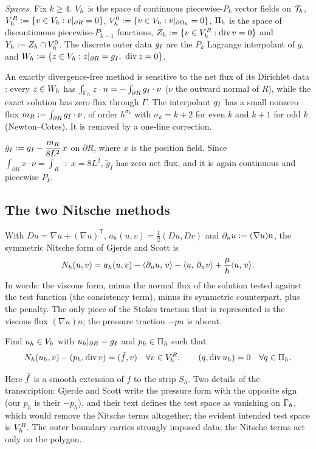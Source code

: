 \emph{Spaces.} Fix $k\ge4$. $V_h$ is the space of continuous piecewise-$P_k$ vector fields on $\mathcal T_h$, $V_h^R:=\{v\in V_h:v|_{\partial R}=0\}$, $V_h^0:=\{v\in V_h:v|_{\partial\Omega_h}=0\}$, $\Pi_h$ is the space of discontinuous piecewise-$P_{k-1}$ functions, $Z_h:=\{v\in V_h^R:\operatorname{div} v=0\}$ and $Y_h:=Z_h\cap V_h^0$. The discrete outer data $g_I$ are the $P_k$ Lagrange interpolant of $g$, and $W_h:=\{z\in V_h:z|_{\partial R}=g_I,\ \operatorname{div} z=0\}$.

An exactly divergence-free method is sensitive to the net flux of its Dirichlet data \cite{EickmannScottTscherpel2025}: every $z\in W_h$ has $\int_{\Gamma_h}z\cdot n=-\int_{\partial R}g_I\cdot\nu$ ($\nu$ the outward normal of $R$), while the exact solution has zero flux through $\Gamma$. The interpolant $g_I$ has a small nonzero flux $m_R:=\int_{\partial R}g_I\cdot\nu$, of order $h^{\sigma_k}$ with $\sigma_k=k+2$ for even $k$ and $k+1$ for odd $k$ (Newton--Cotes). It is removed by a one-line correction.

\begin{definition}\label{def:flux}
$\tilde g_I:=g_I-\dfrac{m_R}{8L^2}\,x$ on $\partial R$, where $x$ is the position field. Since $\int_{\partial R}x\cdot\nu=\int_R\div x=8L^2$, $\tilde g_I$ has zero net flux, and it is again continuous and piecewise $P_k$.
\end{definition}

\subsection{The two Nitsche methods}
With $Du=\nabla u+(\nabla u)^{\mathsf T}$, $a_h(u,v)=\frac12(Du,Dv)$ and $\partial_n u:=(\nabla u)n$, the symmetric Nitsche form of Gjerde and Scott is
\[
N_h(u,v)=a_h(u,v)-\langle \partial_n u,\, v\rangle-\langle u,\, \partial_n v\rangle+\frac{\mu}{h}\langle u,\, v\rangle.
\]
In words: the viscous form, minus the normal flux of the solution tested against the test function (the consistency term), minus its symmetric counterpart, plus the penalty. The only piece of the Stokes traction that is represented is the viscous flux $(\nabla u)n$; the pressure traction $-pn$ is absent.

\begin{definition}
Find $u_h\in V_h$ with $u_h|_{\partial R}=g_I$ and $p_h\in\Pi_h$ such that
\[
N_h(u_h,v)-(p_h,\operatorname{div} v)=(\tilde f,v)\quad\forall v\in V_h^R,\qquad (q,\operatorname{div} u_h)=0\quad\forall q\in\Pi_h.
\]
\end{definition}
Here $\tilde f$ is a smooth extension of $f$ to the strip $S_h$. Two details of the transcription: Gjerde and Scott write the pressure form with the opposite sign (our $p_h$ is their $-p_h$), and their text defines the test space as vanishing on $\Gamma_h$, which would remove the Nitsche terms altogether; the evident intended test space is $V_h^R$. The outer boundary carries strongly imposed data; the Nitsche terms act only on the polygon.

